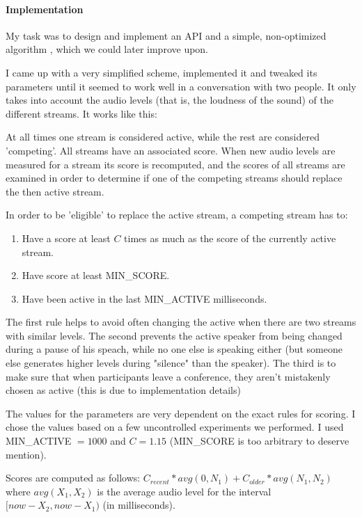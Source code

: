 \documentclass[twoside,openright,a4paper,11pt,english]{article}
\begin{document}
\paragraph*{Implementation}
My task was to design and implement an API and a simple, non-optimized
algorithm , which we could later improve upon. 

I came up with a very simplified scheme, implemented it and tweaked its parameters until it seemed to
work well in a conversation with two people. It only takes into account the
audio levels (that is, the loudness of the sound) of the different streams. It
works like this:

At all times one stream is considered active, while the rest are considered
'competing'. All streams have an associated score. When new audio levels are
measured for a stream its score is recomputed,
and the scores of all streams are examined in order to determine if one of
the competing streams should replace the then active stream.

In order to be 'eligible' to replace the active stream, a competing stream has to:
\begin{enumerate}
    \item Have a score at least $C$ times as much as the score of the currently active stream.
    \item Have score at least MIN\_SCORE.
    \item Have been active in the last MIN\_ACTIVE milliseconds.
\end{enumerate}

The first rule helps to avoid often changing the active when there are two
streams with similar levels. The second prevents the active speaker from being
changed during a pause of his speach, while no one else is speaking either (but
someone else generates higher levels during "silence" than the speaker). The
third is to make sure that when participants leave a conference, they aren't
mistakenly chosen as active (this is due to implementation details)

The values for the parameters are very dependent on the exact rules for scoring.
I chose the values based on a few uncontrolled experiments we performed. I used
MIN\_ACTIVE $= 1000$ and $C = 1.15$ (MIN\_SCORE is too arbitrary to deserve mention).

Scores are computed as follows: $C_{recent} * avg(0, N_1) + C_{older} * avg(N_1, N_2)$
where $avg(X_1, X_2)$ is the average audio level for the interval $[now-X_2,
now-X_1)$ (in milliseconds). 
\end{document}
